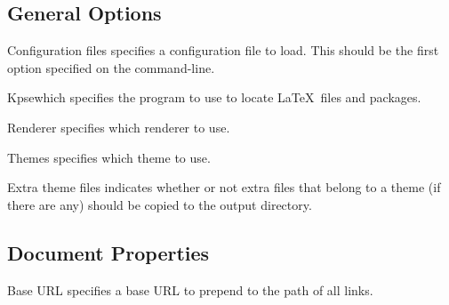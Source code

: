 \subsection{General Options}\label{sec:general-options}

\begin{configuration}{Configuration files}
specifies a configuration file to load.  This should be the first option
specified on the command-line.
\end{configuration}

\begin{configuration}{Kpsewhich}
specifies the  program to use to locate \LaTeX\
files and packages.
\end{configuration}

\begin{configuration}{Renderer}
specifies which renderer to use.
\end{configuration}

\begin{configuration}{Themes}
specifies which theme to use.
\end{configuration}

\begin{configuration}{Extra theme files}
indicates whether or not extra files that belong to a theme (if there are
any) should be copied to the output directory.
\end{configuration}


\subsection{Document Properties\label{sec:config-document}}

\begin{configuration}{Base URL}
specifies a base URL to prepend to the path of all links.
\end{configuration}

